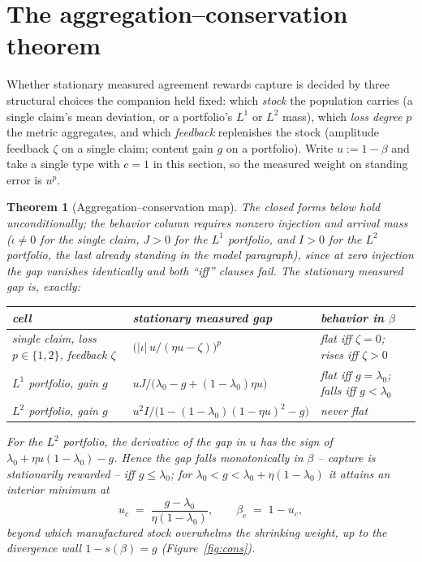 \documentclass[11pt]{article}
\newtheorem{theorem}{Theorem}[section]
\theoremstyle{definition}
\theoremstyle{remark}
\numberwithin{equation}{section}
\begin{document}
\section{The aggregation--conservation theorem}\label{sec:conservation}

Whether stationary measured agreement rewards capture is decided by three structural choices the companion held fixed: which \emph{stock} the population carries (a single claim's mean deviation, or a portfolio's $L^1$ or $L^2$ mass), which \emph{loss degree} $p$ the metric aggregates, and which \emph{feedback} replenishes the stock (amplitude feedback $\zeta$ on a single claim; content gain $g$ on a portfolio). Write $u:=1-\beta$ and take a single type with $c=1$ in this section, so the measured weight on standing error is $u^p$.

\begin{theorem}[Aggregation--conservation map]\label{thm:conservation}
The closed forms below hold unconditionally; the behavior column requires nonzero injection and arrival mass ($\iota\neq0$ for the single claim, $J>0$ for the $L^1$ portfolio, and $I>0$ for the $L^2$ portfolio, the last already standing in the model paragraph), since at zero injection the gap vanishes identically and both ``iff'' clauses fail. The stationary measured gap is, exactly:
\begin{center}
\footnotesize
\setlength{\tabcolsep}{5pt}
\begin{tabular}{lll}
\toprule
\textbf{cell} & \textbf{stationary measured gap} & \textbf{behavior in $\beta$}\\
\midrule
single claim, loss $p\in\{1,2\}$, feedback $\zeta$ &
$\bigl(|\iota|\,u/(\eta u - \zeta)\bigr)^{p}$ &
flat iff $\zeta=0$; rises iff $\zeta>0$\\[3pt]
$L^1$ portfolio, gain $g$ &
$u J/\bigl(\lambda_0-g+(1-\lambda_0)\eta u\bigr)$ &
flat iff $g=\lambda_0$; falls iff $g<\lambda_0$\\[3pt]
$L^2$ portfolio, gain $g$ &
$u^2 I/\bigl(1-(1-\lambda_0)(1-\eta u)^2-g\bigr)$ &
never flat\\
\bottomrule
\end{tabular}
\end{center}
For the $L^2$ portfolio, the derivative of the gap in $u$ has the sign of $\lambda_0+\eta u(1-\lambda_0)-g$. Hence the gap falls monotonically in $\beta$ -- capture is stationarily \emph{rewarded} -- iff $g\le\lambda_0$; for $\lambda_0<g<\lambda_0+\eta(1-\lambda_0)$ it attains an interior minimum at
\[
u_c \;=\; \frac{g-\lambda_0}{\eta(1-\lambda_0)},
\qquad \beta_c \;=\; 1-u_c,
\]
beyond which manufactured stock overwhelms the shrinking weight, up to the divergence wall $1-s(\beta)=g$ (Figure~\ref{fig:cons}).
\end{theorem}
\end{document}
